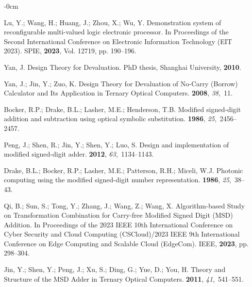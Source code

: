 \documentclass[electronics,article,accept,pdftex,moreauthors]{Definitions/mdpi}
\begin{document}
\begin{adjustwidth}{-\extralength}{0cm}
\begin{thebibliography}{999}
Lu, Y.; Wang, H.; Huang, J.; Zhou, X.; Wu, Y.
\newblock Demonstration system of reconfigurable multi-valued logic electronic
  processor.
\newblock In Proceedings of the Second International Conference on Electronic
  Information Technology (EIT 2023). SPIE,  \textbf{2023}, Vol. 12719, pp.
  190--196.

Yan, J.
\newblock Design Theory for Devaluation.
\newblock PhD thesis, Shanghai University,  \textbf{2010}.

Yan, J.; Jin, Y.; Zuo, K.
\newblock Design Theory for Devaluation of No-Carry (Borrow) Calculator and Its
  Application in Ternary Optical Computers.
 {\bf
  \textbf{2008}}, {\em 38},~11.

Bocker, R.P.; Drake, B.L.; Lasher, M.E.; Henderson, T.B.
\newblock Modified signed-digit addition and subtraction using optical symbolic
  substitution.
 {\bf \textbf{1986}}, {\em
  25},~2456--2457.

Peng, J.; Shen, R.; Jin, Y.; Shen, Y.; Luo, S.
\newblock Design and implementation of modified signed-digit adder.
 {\bf \textbf{2012}},
  {\em 63},~1134--1143.

Drake, B.L.; Bocker, R.P.; Lasher, M.E.; Patterson, R.H.; Miceli, W.J.
\newblock Photonic computing using the modified signed-digit number
  representation.
 {\bf \textbf{1986}}, {\em
  25},~38--43.

Qi, B.; Sun, S.; Tong, Y.; Zhang, J.; Wang, Z.; Wang, X.
\newblock Algorithm-based Study on Transformation Combination for Carry-free
  Modified Signed Digit (MSD) Addition.
\newblock In Proceedings of the 2023 IEEE 10th International Conference on
  Cyber Security and Cloud Computing (CSCloud)/2023 IEEE 9th International
  Conference on Edge Computing and Scalable Cloud (EdgeCom). IEEE,
  \textbf{2023}, pp. 298--304.

Jin, Y.; Shen, Y.; Peng, J.; Xu, S.; Ding, G.; Yue, D.; You, H.
\newblock Theory and Structure of the MSD Adder in Ternary Optical Computers.
 {\bf
  \textbf{2011}}, {\em 41},~541--551.

\end{thebibliography}


%
%
%
\PublishersNote{}
\end{adjustwidth}
\end{document}
